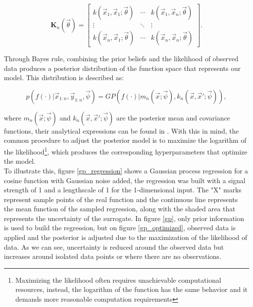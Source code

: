 \documentclass{article}
\begin{document}
\begin{equation}
    \textbf{K}_n(\vec{\theta}) =
    \begin{bmatrix}
        k(\vec{x}_1,\vec{x}_1;\vec{\theta}) & \cdots & k(\vec{x}_1,\vec{x}_n;\vec{\theta}) \\
        \vdots & \ddots & \vdots\\
        k(\vec{x}_n,\vec{x}_1;\vec{\theta}) & \cdots & k(\vec{x}_n,\vec{x}_n;\vec{\theta})
    \end{bmatrix}.
\end{equation}

Through Bayes rule, combining the prior beliefs and the likelihood of observed data produces a posterior distribution of the function space that represents our model. This distribution is described as\cite{Pandita2016}:

\begin{equation}
    p(f(\cdot)|\vec{x}_{1:n},\vec{y}_{1:n},\vec{\psi}) = GP(f(\cdot)|m_n(\vec{x};\vec{\psi}),k_n(\vec{x},\vec{x}';\vec{\psi})),
\end{equation}

where $m_n(\vec{x};\vec{\psi})$ and $k_n(\vec{x},\vec{x}';\vec{\psi})$ are the posterior mean and covariance functions, their analytical expressions can be found in \cite{Pandita2016}. With this in mind, the common procedure to adjust the posterior model is to maximize the logarithm of the likelihood\footnote{Maximizing the likelihood often requires unachievable computational resources, instead, the logarithm of the function has the same behavior and it demands more reasonable computation requirements}, which produces the corresponding hyperparameters that optimize the model.\\

To illustrate this, figure \ref{gp_regression} shows a Gaussian process regression for a cosine function with Gaussian noise added, the regression was built with a signal strength of 1 and a lengthscale of 1 for the 1-dimensional input. The "X" marks represent sample points of the real function and the continuous line represents the mean function of the sampled regression, along with the shaded area that represents the uncertainty of the surrogate. In figure \ref{gp}, only prior information is used to build the regression, but on figure \ref{gp_optimized}, observed data is applied and the posterior is adjusted due to the maximization of the likelihood of data. As we can see, uncertainty is reduced around the observed data but increases around isolated data points or where there are no observations.
\end{document}
